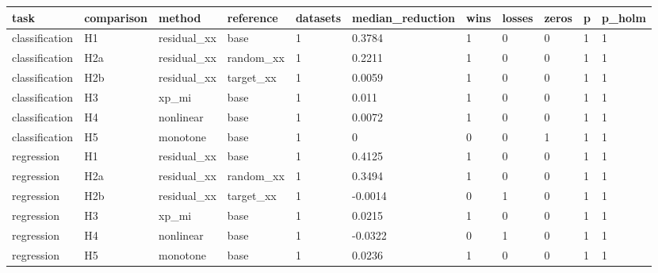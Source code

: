 \begin{tabular}{lllllllllll}
\toprule
task & comparison & method & reference & datasets & median\_reduction & wins & losses & zeros & p & p\_holm \\
\midrule
classification & H1 & residual\_xx & base & 1 & 0.3784 & 1 & 0 & 0 & 1 & 1 \\
classification & H2a & residual\_xx & random\_xx & 1 & 0.2211 & 1 & 0 & 0 & 1 & 1 \\
classification & H2b & residual\_xx & target\_xx & 1 & 0.0059 & 1 & 0 & 0 & 1 & 1 \\
classification & H3 & xp\_mi & base & 1 & 0.011 & 1 & 0 & 0 & 1 & 1 \\
classification & H4 & nonlinear & base & 1 & 0.0072 & 1 & 0 & 0 & 1 & 1 \\
classification & H5 & monotone & base & 1 & 0 & 0 & 0 & 1 & 1 & 1 \\
regression & H1 & residual\_xx & base & 1 & 0.4125 & 1 & 0 & 0 & 1 & 1 \\
regression & H2a & residual\_xx & random\_xx & 1 & 0.3494 & 1 & 0 & 0 & 1 & 1 \\
regression & H2b & residual\_xx & target\_xx & 1 & -0.0014 & 0 & 1 & 0 & 1 & 1 \\
regression & H3 & xp\_mi & base & 1 & 0.0215 & 1 & 0 & 0 & 1 & 1 \\
regression & H4 & nonlinear & base & 1 & -0.0322 & 0 & 1 & 0 & 1 & 1 \\
regression & H5 & monotone & base & 1 & 0.0236 & 1 & 0 & 0 & 1 & 1 \\
\bottomrule
\end{tabular}
